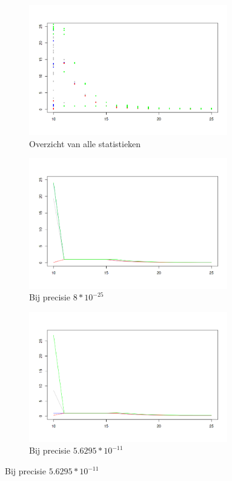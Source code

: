 \documentclass{article}
\begin{document}
\begin{figure}[!htb]
 \caption{FPS/maximaal aantal iteraties ($\log_2(it)$)}
 \begin{subfigure}{0.49\textwidth}
  \caption{Overzicht van alle statistieken}
  \includegraphics[width=0.95\textwidth]{elegant-gl/datasets/plot_it}
 \end{subfigure}
 \begin{subfigure}{0.49\textwidth}
  \caption{Bij precisie $8*10^{-25}$}
  \includegraphics[width=0.95\textwidth]{elegant-gl/datasets/plot_it_8e-25prec}
 \end{subfigure}
 \begin{subfigure}{0.49\textwidth}
  \caption{Bij precisie $5.6295*10^{-11}$}
  \includegraphics[width=0.95\textwidth]{elegant-gl/datasets/plot_it_5.6295e-11prec}

\end{subfigure}
\end{figure}
\end{document}
